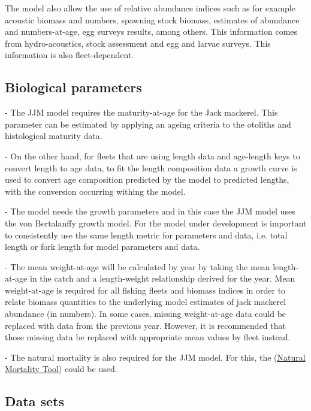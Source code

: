 \documentclass{article}
\begin{document}
The model also allow the use of relative abundance indices such as for example acoustic biomass and numbers, spawning stock biomass, estimates of abundance and numbers-at-age, egg surveys results, among others. This information comes from hydro-acoustics, stock assessment and egg and larvae surveys. This information is also fleet-dependent.

\subsection{Biological parameters}

- The JJM model requires the maturity-at-age for the Jack mackerel. This parameter can be estimated by applying an ageing criteria to the otoliths and histological maturity data.

- On the other hand, for fleets that are using length data and age-length keys to convert length to age data, to fit the length composition data a growth curve is used to convert age composition predicted by the model to predicted lengths, with the conversion occurring withing the model.

- The model needs the growth parameters and in this case the JJM model uses the von Bertalanffy growth model. For the model under development is important to consistently use the same length metric for parameters and data, i.e. total length or fork length for model parameters and data.

- The mean weight-at-age will be calculated by year by taking the mean length-at-age in the catch and a length-weight relationship derived for the year. Mean weight-at-age is required for all fishing fleets and biomass indices in order to relate biomass quantities to the underlying model estimates of jack mackerel abundance (in numbers). In some cases, missing weight-at-age data could be replaced with data from the previous year. However, it is recommended that those missing data be replaced with appropriate mean values by fleet instead. 

- The natural mortality is also required for the JJM model. For this, the (\href{https://connect.fisheries.noaa.gov/natural-mortality-tool/}{Natural Mortality Tool}) could be used. 

\subsection{Data sets}
\end{document}

